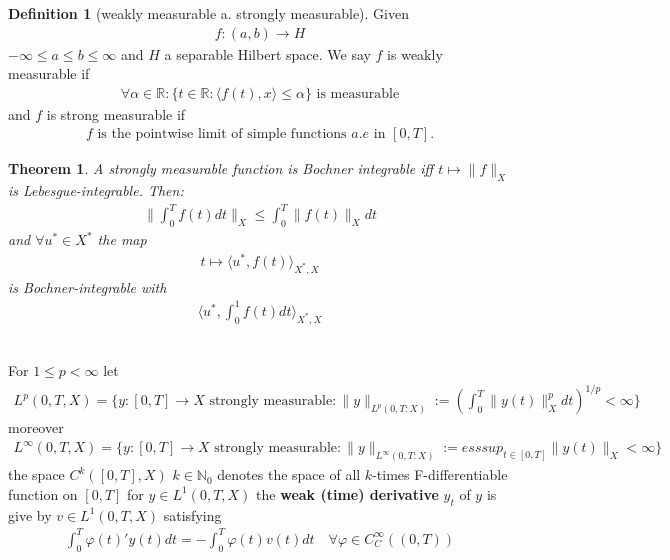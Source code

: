 \documentclass[a4paper,11pt,fleqn]{book}
\newtheorem{theorem}{Theorem}[section]
\theoremstyle{definition}
\newtheorem{definition}{Definition}[section]
\theoremstyle{remark}
\begin{document}
\begin{definition}[weakly measurable a. strongly measurable]
	Given 
	\begin{align*}
		f: (a, b) \rightarrow H
	\end{align*}
	$-\infty \le a \le b \le \infty$ and $H$ a separable Hilbert space. We say $f$ is weakly measurable if 
	\begin{align*}
		\forall \alpha \in \mathbb{R}: \{t \in \mathbb{R}: \langle f(t), x \rangle \le \alpha \}  \text{ is measurable}
	\end{align*}
	and $f$ is strong measurable if 
	\begin{align*}
		\text{$f$ is the pointwise limit of simple functions } a.e \text{ in } [0, T].
	\end{align*}
\end{definition}

\begin{theorem}
	A strongly measurable function is Bochner integrable iff $t \mapsto \|f\|_X$ is Lebesgue-integrable. Then:
	\begin{align*}
		\| \int_0^T f(t) dt \|_X \le \int_0^T \|f(t)\|_X dt
	\end{align*}
	and $\forall u^* \in X^*$ the map
	\begin{align*}
		t \mapsto \langle u^*, f(t) \rangle_{X^*, X} 
	\end{align*}
	is Bochner-integrable with 
	\begin{align*}
		\langle u^*, \int_0^1 f(t)dt \rangle_{X^*, X}
	\end{align*}
\end{theorem}

\quad\\
For $1 \le p < \infty$ let
\begin{align*}
	L^p(0, T, X) = \bigg\{ y: [0, T] \rightarrow X \text{ strongly measurable}: \|y\|_{L^p(0, T: X)}:= (\int_0^T\|y(t)\|_X^p dt)^{1 \slash p} < \infty \bigg\}
\end{align*}
moreover
\begin{align*}
	L^\infty(0, T, X) = \bigg\{ y: [0, T] \rightarrow X \text{ strongly measurable}: \|y\|_{L^\infty(0, T: X)}:= esssup_{t \in [0, T]} \|y(t)\|_X < \infty \bigg\}
\end{align*}
the space $C^k([0, T], X)$ $k \in \mathbb{N}_0$ denotes the space of all $k$-times F-differentiable function on $[0, T]$ for $y \in L^1(0, T, X)$ the \textbf{weak (time) derivative} $y_t$ of $y$ is give by $v \in L^1(0, T, X)$ satisfying
\begin{align*}
	\int_0^T \varphi(t)'y(t) dt = -\int_0^T \varphi(t) v(t) dt
	\quad \forall \varphi \in C_C^\infty((0, T))
\end{align*}
\end{document}
